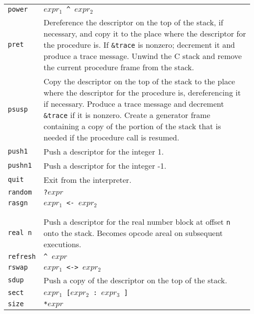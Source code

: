 \begin{xtabular}{l@{\hspace{1.5cm}}p{13.5cm}}
\texttt{power}   & \texttt{$expr_1$ \textasciicircum\ $expr_2$}\\

\texttt{pret}    & Dereference the descriptor on the top of the stack, if
necessary, and copy it to the place where the descriptor for the
procedure is. If \texttt{\&trace} is nonzero; decrement it and produce a trace
message. Unwind the C stack and remove the current procedure frame
from the stack.\\

\texttt{psusp}   & Copy the descriptor on the top of the stack to the place
where the descriptor for the procedure is, dereferencing it if
necessary. Produce a trace message and decrement \texttt{\&trace} if it is
nonzero. Create a generator frame containing a copy of the portion of
the stack that is needed if the procedure call is resumed.\\

\texttt{push1}   & Push a descriptor for the integer 1.\\

\texttt{pushn1}  & Push a descriptor for the integer -1.\\

\texttt{quit}    & Exit from the interpreter.\\

\texttt{random}  & \texttt{?$expr$}\\

\texttt{rasgn}   & \texttt{$expr_1$ <- $expr_2$}\\

\\
\\

\texttt{real n}  & Push a descriptor for the real number block at offset
\texttt{n} onto the stack.  Becomes opcode areal on subsequent executions.\\

\texttt{refresh} & \texttt{\textasciicircum\ $expr$}\\

\texttt{rswap}   & \texttt{$expr_1$ <-> $expr_2$}\\

\texttt{sdup}    & Push a copy of the descriptor on the top of the stack.\\

\texttt{sect}    & \texttt{$expr_1$ [$expr_2$ : $expr_3$ ]}\\

\texttt{size}    & \texttt{*$expr$}\\


\end{xtabular}
